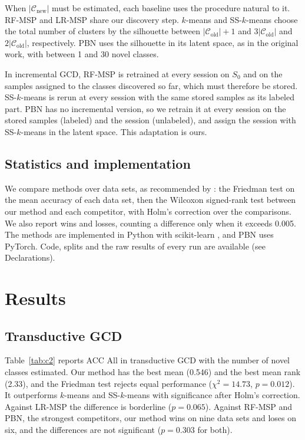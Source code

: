 \documentclass[pdflatex,sn-basic]{sn-jnl}
\newcommand{\Cold}{\mathcal{C}_{\mathrm{old}}}
\newcommand{\Cnew}{\mathcal{C}_{\mathrm{new}}}
\begin{document}
When $|\Cnew|$ must be estimated, each baseline uses the procedure natural to it. RF-MSP and LR-MSP share our discovery step. $k$-means and SS-$k$-means choose the total number of clusters by the silhouette between $|\Cold|+1$ and $3|\Cold|$ and $2|\Cold|$, respectively. PBN uses the silhouette in its latent space, as in the original work, with between 1 and 30 novel classes.

In incremental GCD, RF-MSP is retrained at every session on $S_0$ and on the samples assigned to the classes discovered so far, which must therefore be stored. SS-$k$-means is rerun at every session with the same stored samples as its labeled part. PBN has no incremental version, so we retrain it at every session on the stored samples (labeled) and the session (unlabeled), and assign the session with SS-$k$-means in the latent space. This adaptation is ours.

\subsection{Statistics and implementation}

We compare methods over data sets, as recommended by \citet{demsar2006}: the Friedman test on the mean accuracy of each data set, then the Wilcoxon signed-rank test between our method and each competitor, with Holm's correction \citep{holm1979} over the comparisons. We also report wins and losses, counting a difference only when it exceeds 0.005. The methods are implemented in Python with scikit-learn \citep{pedregosa2011sklearn}, and PBN uses PyTorch. Code, splits and the raw results of every run are available (see Declarations).

\section{Results}\label{sec:results}

\subsection{Transductive GCD}\label{sec:res-c2}

Table~\ref{tab:c2} reports ACC All in transductive GCD with the number of novel classes estimated. Our method has the best mean (0.546) and the best mean rank (2.33), and the Friedman test rejects equal performance ($\chi^2 = 14.73$, $p = 0.012$). It outperforms $k$-means and SS-$k$-means with significance after Holm's correction. Against LR-MSP the difference is borderline ($p = 0.065$). Against RF-MSP and PBN, the strongest competitors, our method wins on nine data sets and loses on six, and the differences are not significant ($p = 0.303$ for both).
\end{document}

